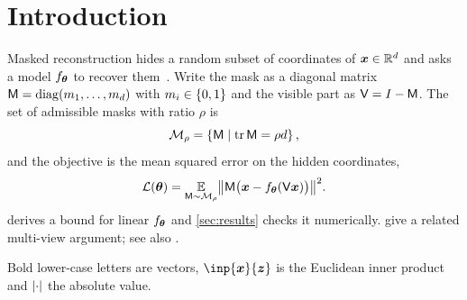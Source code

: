 \section{Introduction}\label{sec:intro}

Masked reconstruction hides a random subset of coordinates of $\bm{x} \in \mathbb{R}^d$ and asks a
model $f_{\bm{\theta}}$ to recover them~\citep{doe2023masked}. Write the mask as a diagonal
matrix $\mathsf{M} = \operatorname{diag}(m_1, \dots, m_d)$ with $m_i \in \set{0, 1}$ and the visible part as
$\mathsf{V} = I - \mathsf{M}$. The set of admissible masks with ratio $\rho$ is
\[
  \mathcal{M}_\rho = \set{\mask}[\tr \mask = \rho d],
\]
and the objective is the mean squared error on the hidden coordinates,
\begin{equation}\label{eq:objective}
  \loss = \Exp_{\mask \sim \mathcal{M}_\rho} \norm*{\mask\bigl(\vx - f_{\vtheta}(\vis \vx)\bigr)}^2 .
\end{equation}
 derives a bound for linear $f_{\bm{\theta}}$ and \cref{sec:results} checks
it numerically.  give a related multi-view argument; see also
\citep[Sec.~3]{doe2023masked}.

\begin{keypoint}[Notation]
  Bold lower-case letters are vectors, $\inp{\vx}{\vz}$ is the Euclidean inner product and
  $\lvert\cdot\rvert$ the absolute value. 
\end{keypoint}
